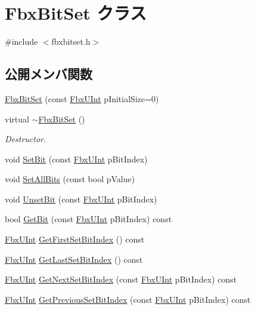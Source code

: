 \hypertarget{class_fbx_bit_set}{}\section{Fbx\+Bit\+Set クラス}
\label{class_fbx_bit_set}


{\ttfamily \#include $<$fbxbitset.\+h$>$}

\subsection*{公開メンバ関数}
\begin{DoxyCompactItemize}
\item 
\hyperlink{class_fbx_bit_set_ad2f5e43f377d1382c847befddb386710}{Fbx\+Bit\+Set} (const \hyperlink{fbxtypes_8h_ae9fb141d8158a730aa85ec5ff2ea3f6b}{Fbx\+U\+Int} p\+Initial\+Size=0)
\item 
virtual \hyperlink{class_fbx_bit_set_af1b946280a865ffe296f72d0a7648c18}{$\sim$\+Fbx\+Bit\+Set} ()
\begin{DoxyCompactList}\small\item\em Destructor. \end{DoxyCompactList}\item 
void \hyperlink{class_fbx_bit_set_a1aa861ea6719807763a3faf01d9a8fd5}{Set\+Bit} (const \hyperlink{fbxtypes_8h_ae9fb141d8158a730aa85ec5ff2ea3f6b}{Fbx\+U\+Int} p\+Bit\+Index)
\item 
void \hyperlink{class_fbx_bit_set_a1386fb2e41b67394008e63e445dc079e}{Set\+All\+Bits} (const bool p\+Value)
\item 
void \hyperlink{class_fbx_bit_set_ade99ba2a4fc49743b4d2e2037a5d4e28}{Unset\+Bit} (const \hyperlink{fbxtypes_8h_ae9fb141d8158a730aa85ec5ff2ea3f6b}{Fbx\+U\+Int} p\+Bit\+Index)
\item 
bool \hyperlink{class_fbx_bit_set_a79b538f2c893476457eac2b11d1d7e28}{Get\+Bit} (const \hyperlink{fbxtypes_8h_ae9fb141d8158a730aa85ec5ff2ea3f6b}{Fbx\+U\+Int} p\+Bit\+Index) const
\item 
\hyperlink{fbxtypes_8h_ae9fb141d8158a730aa85ec5ff2ea3f6b}{Fbx\+U\+Int} \hyperlink{class_fbx_bit_set_ac7747c0ffab8b6d63d931e52548a0f2a}{Get\+First\+Set\+Bit\+Index} () const
\item 
\hyperlink{fbxtypes_8h_ae9fb141d8158a730aa85ec5ff2ea3f6b}{Fbx\+U\+Int} \hyperlink{class_fbx_bit_set_af7459511dca956e445c733e1b1b43ef9}{Get\+Last\+Set\+Bit\+Index} () const
\item 
\hyperlink{fbxtypes_8h_ae9fb141d8158a730aa85ec5ff2ea3f6b}{Fbx\+U\+Int} \hyperlink{class_fbx_bit_set_a95f7f4e88d181f4ce61cc24bef217cc4}{Get\+Next\+Set\+Bit\+Index} (const \hyperlink{fbxtypes_8h_ae9fb141d8158a730aa85ec5ff2ea3f6b}{Fbx\+U\+Int} p\+Bit\+Index) const
\item 
\hyperlink{fbxtypes_8h_ae9fb141d8158a730aa85ec5ff2ea3f6b}{Fbx\+U\+Int} \hyperlink{class_fbx_bit_set_a4a254f2f2906494c4c23452f03a1c399}{Get\+Previous\+Set\+Bit\+Index} (const \hyperlink{fbxtypes_8h_ae9fb141d8158a730aa85ec5ff2ea3f6b}{Fbx\+U\+Int} p\+Bit\+Index) const
\end{DoxyCompactItemize}


